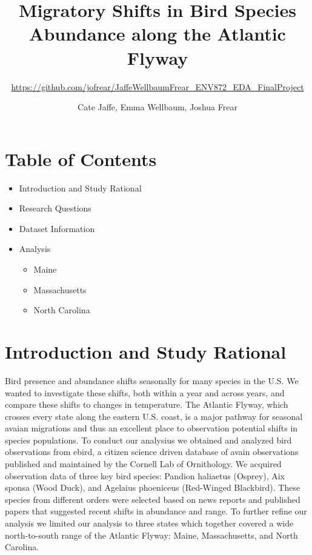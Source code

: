 \documentclass[
  12pt,
]{article}
\title{Migratory Shifts in Bird Species Abundance along the Atlantic
Flyway}
\subtitle{\url{https://github.com/jofrear/JaffeWellbaumFrear_ENV872_EDA_FinalProject}}
\author{Cate Jaffe, Emma Wellbaum, Joshua Frear}
\date{}
\providecommand{\tightlist}{%
  \setlength{\itemsep}{0pt}\setlength{\parskip}{0pt}}
\begin{document}
\maketitle

\hypertarget{table-of-contents}{%
\section{Table of Contents}\label{table-of-contents}}

\begin{itemize}
\tightlist
\item
  Introduction and Study Rational
\item
  Research Questions
\item
  Dataset Information
\item
  Analysis

  \begin{itemize}
  \tightlist
  \item
    Maine
  \item
    Massachusetts
  \item
    North Carolina
  \end{itemize}
\end{itemize}

\newpage

\hypertarget{introduction-and-study-rational}{%
\section{Introduction and Study
Rational}\label{introduction-and-study-rational}}

Bird presence and abundance shifts seasonally for many species in the
U.S. We wanted to investigate these shifts, both within a year and
across years, and compare these shifts to changes in temperature. The
Atlantic Flyway, which crosses every state along the eastern U.S. coast,
is a major pathway for seasonal avaian migrations and thus an excellent
place to observation potential shifts in species populations. To conduct
our analysius we obtained and analyzed bird observations from ebird, a
citizen science driven database of avain observations published and
maintained by the Cornell Lab of Ornithology. We acquired observation
data of three key bird species: Pandion haliaetus (Osprey), Aix sponsa
(Wood Duck), and Agelaius phoeniceus (Red-Winged Blackbird). These
species from different orders were selected based on news reports and
published papers that suggested recent shifts in abundance and range. To
further refine our analysis we limited our analysis to three states
which together covered a wide north-to-south range of the Atlantic
Flyway: Maine, Massachusetts, and North Carolina.
\end{document}
